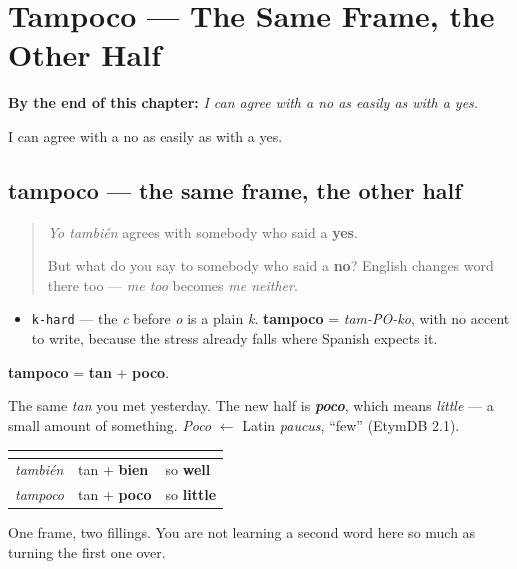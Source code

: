 
\chapter{Tampoco --- The Same Frame, the Other Half}
\label{ch:tampoco}

\begin{chapteropening}
\textbf{By the end of this chapter:} \emph{I can agree with a no as easily as with a yes.}

I can agree with a no as easily as with a yes.
\end{chapteropening}

\section[tampoco]{tampoco — the same frame, the other half}

\label{lesson:ES-C58-tampoco}



\begin{quote}
\emph{Yo también} agrees with somebody who said a \textbf{yes}.

But what do you say to somebody who said a \textbf{no}? English changes word there too — \emph{me too} becomes \emph{me neither}.
\end{quote}

\begin{sounds}
\begin{itemize}
\raggedright
  \item \texttt{k-hard} — the \emph{c} before \emph{o} is a plain \emph{k}. \textbf{tampoco} = \emph{tam-PO-ko}, with no accent to write, because the stress already falls where Spanish expects it.
\end{itemize}
\end{sounds}

\begin{cousinweb}
\textbf{tampoco} = \textbf{tan} + \textbf{poco}.

The same \emph{tan} you met yesterday. The new half is \emph{\textbf{poco}}, which means \emph{little} — a small amount of something. \emph{Poco} $\leftarrow$ Latin \emph{paucus}, \textquotedblleft{}few\textquotedblright{} (EtymDB 2.1).

\noindent
\begin{tabularx}{\linewidth}{@{}>{\raggedright\arraybackslash}X>{\raggedright\arraybackslash}X>{\raggedright\arraybackslash}X@{}}
\toprule
\textbf{} & \textbf{} & \textbf{} \\
\midrule
\emph{también} & tan + \textbf{bien} & so \textbf{well} \\
\emph{tampoco} & tan + \textbf{poco} & so \textbf{little} \\
\bottomrule
\end{tabularx}

One frame, two fillings. You are not learning a second word here so much as turning the first one over.
\end{cousinweb}


